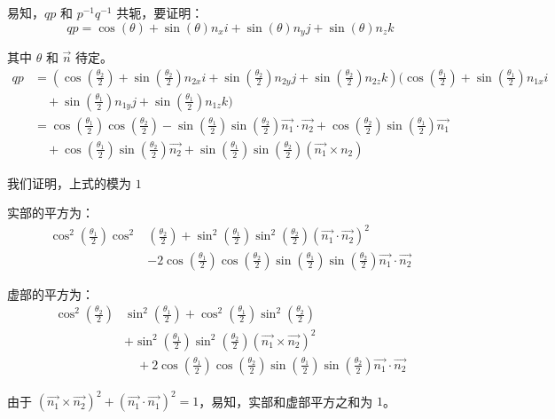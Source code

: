 \documentclass[withoutpreface,bwprint]{cumcmthesis} %
\begin{document}
易知，$qp$ 和 $p^{-1}q^{-1}$ 共轭，要证明：
\[
    qp = \cos(\theta) + \sin(\theta)n_xi + \sin(\theta)n_yj +
    \sin(\theta)n_zk
\]

其中 $\theta$ 和 $\overrightarrow{n}$ 待定。
\[
    \begin{split}
        qp &= (\cos(\frac{\theta _2}{2}) + \sin(\frac{\theta _2}{2})n_{2x}i
        + \sin(\frac{\theta _2}{2})n_{2y}j + \sin(\frac{\theta _2}{2})n_{2z}k)
        (\cos(\frac{\theta _1}{2}) + \sin(\frac{\theta _1}{2})n_{1x}i \\ &\quad +
        \sin(\frac{\theta _1}{2})n_{1y}j + \sin(\frac{\theta _1}{2})n_{1z}k) \\
        &= \cos(\frac{\theta _1}{2})\cos(\frac{\theta _2}{2}) - 
        \sin(\frac{\theta _1}{2})\sin(\frac{\theta _2}{2})\overrightarrow{n_1} 
        \cdot \overrightarrow{n_2} + \cos(\frac{\theta _2}{2})
        \sin(\frac{\theta _1}{2})\overrightarrow{n_1} \\&\quad + 
        \cos(\frac{\theta _1}{2})\sin(\frac{\theta _2}{2})\overrightarrow{n_2} +
        \sin(\frac{\theta _1}{2})\sin(\frac{\theta _2}{2})(\overrightarrow{n_1}
        \times n_2)
    \end{split}
\]

我们证明，上式的模为 $1$ \par
实部的平方为：
\begin{align*}
    \cos ^2(\frac{\theta _1}{2})\cos ^2&(\frac{\theta _2}{2}) +
    \sin ^2(\frac{\theta _1}{2})\sin ^2(\frac{\theta _2}{2})
    (\overrightarrow{n_1} \cdot \overrightarrow{n_2})^2 \\ &-
    2\cos(\frac{\theta _1}{2})\cos(\frac{\theta _2}{2})
    \sin(\frac{\theta _1}{2})\sin(\frac{\theta _2}{2})
    \overrightarrow{n_1} \cdot \overrightarrow{n_2} 
\end{align*}

虚部的平方为：
\begin{align*}
    \cos ^2(\frac{\theta _2}{2})&\sin ^2(\frac{\theta _1}{2}) +
    \cos ^2(\frac{\theta _1}{2})\sin ^2(\frac{\theta _2}{2}) \\ & +
    \sin ^2(\frac{\theta _1}{2})\sin ^2(\frac{\theta _2}{2})
    (\overrightarrow{n_1} \times \overrightarrow{n_2})^2 \\ &\quad +
    2\cos(\frac{\theta _1}{2})\cos(\frac{\theta _2}{2})
    \sin(\frac{\theta _1}{2})\sin(\frac{\theta _2}{2})
    \overrightarrow{n_1} \cdot \overrightarrow{n_2} 
\end{align*}

由于 $(\overrightarrow{n_1} \times \overrightarrow{n_2})^2 + (\overrightarrow{n_1} 
\cdot \overrightarrow{n_1})^2 = 1$，易知，实部和虚部平方之和为 $1$。
\end{document}
